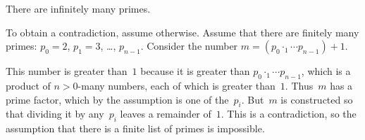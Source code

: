 \documentclass{ibl}  %
\begin{document}
\begin{problem} 
There are infinitely many primes.  
\begin{answer}
To obtain a contradiction, assume otherwise.
Assume that there are finitely many primes: 
$p_0=2$, $p_1=3$, \ldots, $p_{n-1}$.
Consider the number $m=(p_0\cdotp_1\cdots p_{n-1})+1$.

This number is greater than~$1$ because it is greater than 
$p_0\cdotp_1\cdots p_{n-1}$, 
which is a product of $n>0$-many numbers, each of which is greater than~$1$.
Thus~$m$ has a prime factor, which by the assumption is one of the~$p_i$.
But~$m$ is constructed so that dividing it by any~$p_i$ 
leaves a remainder of~$1$.
This is a contradiction, so the assumption that there is a finite
list of primes is impossible.
\end{answer}
\end{problem}
\end{document}
